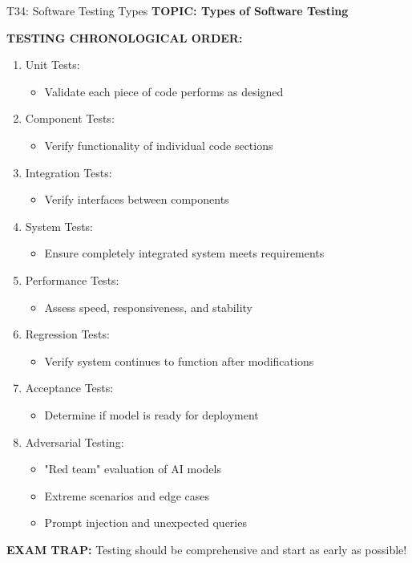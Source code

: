 \documentclass[8pt]{beamer}
\begin{document}
	\begin{frame}{T34: Software Testing Types}
		\fontsize{6.5}{7.5}\selectfont
		\textbf{TOPIC: Types of Software Testing}
		
		\vspace{0.1cm}
		\textbf{TESTING CHRONOLOGICAL ORDER:}
		\begin{enumerate}
			\item \textcolor{myblue}{Unit Tests:}
			\begin{itemize}
				\item Validate each piece of code performs as designed
			\end{itemize}
			\item \textcolor{myblue}{Component Tests:}
			\begin{itemize}
				\item Verify functionality of individual code sections
			\end{itemize}
			\item \textcolor{myblue}{Integration Tests:}
			\begin{itemize}
				\item Verify interfaces between components
			\end{itemize}
			\item \textcolor{myblue}{System Tests:}
			\begin{itemize}
				\item Ensure completely integrated system meets requirements
			\end{itemize}
			\item \textcolor{myblue}{Performance Tests:}
			\begin{itemize}
				\item Assess speed, responsiveness, and stability
			\end{itemize}
			\item \textcolor{myblue}{Regression Tests:}
			\begin{itemize}
				\item Verify system continues to function after modifications
			\end{itemize}
			\item \textcolor{myblue}{Acceptance Tests:}
			\begin{itemize}
				\item Determine if model is ready for deployment
			\end{itemize}
			\item \textcolor{myblue}{Adversarial Testing:}
			\begin{itemize}
				\item "Red team" evaluation of AI models
				\item Extreme scenarios and edge cases
				\item Prompt injection and unexpected queries
			\end{itemize}
		\end{enumerate}
		
		\textcolor{myred}{\textbf{EXAM TRAP:}} Testing should be \textcolor{myblue}{comprehensive and start as early as possible}!
	\end{frame}
	
\end{document}
